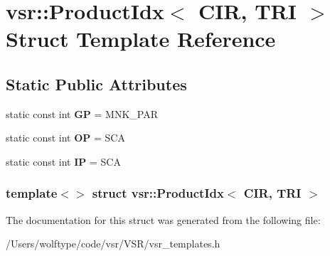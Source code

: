 \hypertarget{structvsr_1_1_product_idx_3_01_c_i_r_00_01_t_r_i_01_4}{\section{vsr\-:\-:Product\-Idx$<$ C\-I\-R, T\-R\-I $>$ Struct Template Reference}
\label{structvsr_1_1_product_idx_3_01_c_i_r_00_01_t_r_i_01_4}
}
\subsection*{Static Public Attributes}
\begin{DoxyCompactItemize}
\item 
\hypertarget{structvsr_1_1_product_idx_3_01_c_i_r_00_01_t_r_i_01_4_a4ffcf4c8f5ce0cf7e922727e57d81b76}{static const int {\bfseries G\-P} = M\-N\-K\-\_\-\-P\-A\-R}\label{structvsr_1_1_product_idx_3_01_c_i_r_00_01_t_r_i_01_4_a4ffcf4c8f5ce0cf7e922727e57d81b76}

\item 
\hypertarget{structvsr_1_1_product_idx_3_01_c_i_r_00_01_t_r_i_01_4_a6ea4fa91c0fdcd6630a9a933c01cd28a}{static const int {\bfseries O\-P} = S\-C\-A}\label{structvsr_1_1_product_idx_3_01_c_i_r_00_01_t_r_i_01_4_a6ea4fa91c0fdcd6630a9a933c01cd28a}

\item 
\hypertarget{structvsr_1_1_product_idx_3_01_c_i_r_00_01_t_r_i_01_4_a45870396dbd35db9f09854241e8ff24b}{static const int {\bfseries I\-P} = S\-C\-A}\label{structvsr_1_1_product_idx_3_01_c_i_r_00_01_t_r_i_01_4_a45870396dbd35db9f09854241e8ff24b}

\end{DoxyCompactItemize}
\subsubsection*{template$<$$>$ struct vsr\-::\-Product\-Idx$<$ C\-I\-R, T\-R\-I $>$}



The documentation for this struct was generated from the following file\-:\begin{DoxyCompactItemize}
\item 
/\-Users/wolftype/code/vsr/\-V\-S\-R/vsr\-\_\-templates.\-h\end{DoxyCompactItemize}
